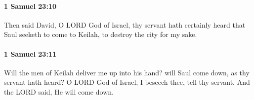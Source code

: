 		\paragraph{1 Samuel 23:10} %
			\label{1SAMUEL-23-10}

			Then said David, O LORD God of Israel, thy servant hath certainly heard that Saul seeketh to come to Keilah, to destroy the city for my sake.


		\paragraph{1 Samuel 23:11} %
			\label{1SAMUEL-23-11}

			Will the men of Keilah deliver me up into his hand? will Saul come down, as thy servant hath heard? O LORD God of Israel, I beseech thee, tell thy servant. And the LORD said, He will come down.


